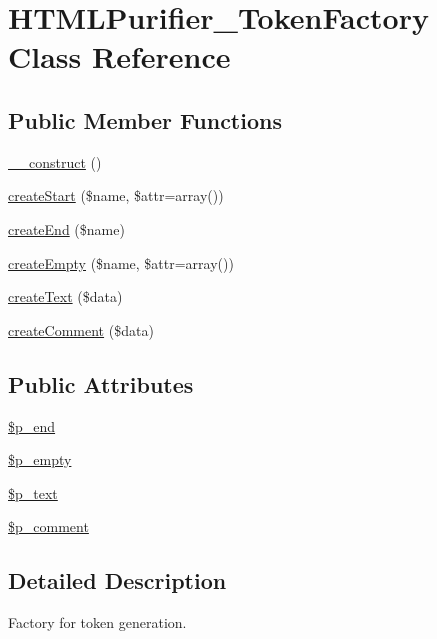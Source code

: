 \hypertarget{classHTMLPurifier__TokenFactory}{\section{H\+T\+M\+L\+Purifier\+\_\+\+Token\+Factory Class Reference}
\label{classHTMLPurifier__TokenFactory}
}
\subsection*{Public Member Functions}
\begin{DoxyCompactItemize}
\item 
\hyperlink{classHTMLPurifier__TokenFactory_a57bf3f5bda520a043e863aeea6d6c56e}{\+\_\+\+\_\+construct} ()
\item 
\hyperlink{classHTMLPurifier__TokenFactory_afcb57f88f3a2ed7ddf4f9c021716f204}{create\+Start} (\$name, \$attr=array())
\item 
\hyperlink{classHTMLPurifier__TokenFactory_a3615bfd0ce60585f890a484eaaaa8977}{create\+End} (\$name)
\item 
\hyperlink{classHTMLPurifier__TokenFactory_a35866a503e0d95cd196a80342ba5b04b}{create\+Empty} (\$name, \$attr=array())
\item 
\hyperlink{classHTMLPurifier__TokenFactory_aef47964d68b7912f9585d53a05d41614}{create\+Text} (\$data)
\item 
\hyperlink{classHTMLPurifier__TokenFactory_ad1a6dcec08aa90ed3352ef20e9c34d45}{create\+Comment} (\$data)
\end{DoxyCompactItemize}
\subsection*{Public Attributes}
\begin{DoxyCompactItemize}
\item 
\hyperlink{classHTMLPurifier__TokenFactory_a8d28d7ec8c618fec3e847b27615ccce9}{\$p\+\_\+end}
\item 
\hyperlink{classHTMLPurifier__TokenFactory_a4a9636ac8d85fb51748a82f3ac5f9687}{\$p\+\_\+empty}
\item 
\hyperlink{classHTMLPurifier__TokenFactory_a44d3335320c4d44bb0a9b2af2df70bcb}{\$p\+\_\+text}
\item 
\hyperlink{classHTMLPurifier__TokenFactory_ac43011acb9be11fad3c5da73f4225b47}{\$p\+\_\+comment}
\end{DoxyCompactItemize}


\subsection{Detailed Description}
Factory for token generation.

